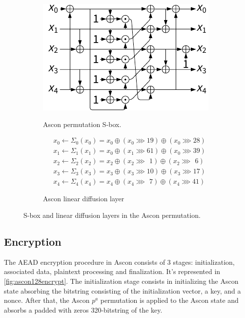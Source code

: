 \documentclass[11pt,twoside]{article}
\begin{document}
\begin{figure}
  \centering
  \begin{subfigure}[b]{0.4\textwidth}
    \includegraphics[scale=1]{assets/sbox.pdf} \\
    \caption{Ascon permutation S-box.}
    \label{fig:asconsbox}
  \end{subfigure}
  \hspace*{0.01\textwidth}
  \begin{subfigure}[B]{0.55\textwidth}
    \begin{align*}
       & x_0 \leftarrow \Sigma_{0}(x_0) = x_0 \oplus (x_0 \ggg 19) \oplus (x_0 \ggg 28)          \\
       & x_1 \leftarrow \Sigma_{1}(x_1) = x_0 \oplus (x_1 \ggg 61) \oplus (x_0 \ggg 39)          \\
       & x_2 \leftarrow \Sigma_{2}(x_2) = x_2 \oplus (x_2 \ggg \ \, 1) \oplus (x_2 \ggg \ \,  6) \\
       & x_3 \leftarrow \Sigma_{3}(x_3) = x_3 \oplus (x_3 \ggg 10) \oplus (x_3 \ggg 17)          \\
       & x_4 \leftarrow \Sigma_{4}(x_4) = x_4 \oplus (x_4 \ggg \ \,  7) \oplus (x_4 \ggg 41)
    \end{align*}
    \vspace*{0.07\textwidth}
    \caption{Ascon linear diffusion layer}
    \label{fig:asconlineardiffusion}
  \end{subfigure}
  \caption{S-box and linear diffusion layers in the Ascon permutation.}
  \label{fig:2}
\end{figure}



\subsection{Encryption}
The AEAD encryption procedure in Ascon consists of 3 stages: initialization, associated data, plaintext processing and finalization. It's represented in \cref{fig:ascon128encrypt}. The initialization stage consists in initializing the Ascon state absorbing the bitstring consisting of the initialization vector, a key, and a nonce. After that, the Ascon $p^a$  permutation is applied to the Ascon state and absorbs a padded with zeros 320-bitstring of the key.
\end{document}
